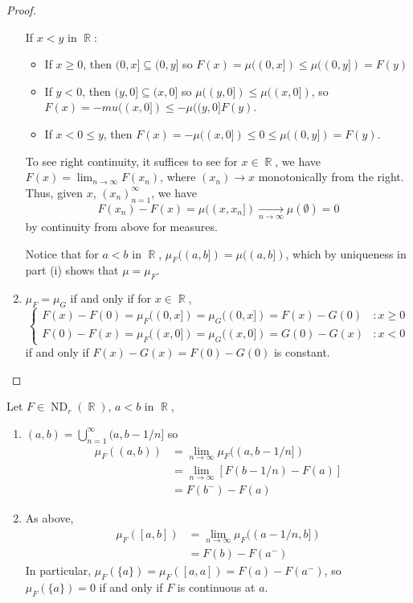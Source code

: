 \documentclass[11pt, a4paper]{memoir}
\DeclareMathOperator{\R}{{\mathbb{R}}}
\theoremstyle{change}
\theoremstyle{plain}
\theoremstyle{nonumberplain}
\newtheorem{proof}{Proof}
\DeclareMathOperator{\ND}{ND}
\begin{document}
\begin{proof}
\begin{enumerate}
            If $x<y$ in $\R$:
            \begin{itemize}[nolistsep]
                \item If $x\geq 0$, then $(0,x]\subseteq(0,y]$ so $F(x)=\mu((0,x])\leq\mu((0,y])=F(y)$
                \item If $y<0$, then $(y,0]\subseteq(x,0]$ so $\mu((y,0])\leq\mu((x,0])$, so $F(x)=-mu((x,0])\leq -\mu((y,0]F(y)$.
                \item If $x<0\leq y$, then $F(x)=-\mu((x,0])\leq 0\leq \mu((0,y])=F(y)$.
            \end{itemize}
            To see right continuity, it suffices to see for $x\in\R$, we have $F(x)=\lim_{n\to\infty} F(x_n)$, where $(x_n)\to x$ monotonically from the right.
            Thus, given $x$, $(x_n)_{n=1}^\infty$, we have
            \begin{equation*}
                F(x_n)-F(x)=\mu((x,x_n])\underset{n\to\infty}\longrightarrow\mu(\emptyset)=0 %
            \end{equation*}
            by continuity from above for measures.

            Notice that for $a<b$ in $\R$, $\mu_F((a,b])=\mu((a,b])$, which by uniqueness in part (i) shows that $\mu=\mu_F$.
        \item $\mu_F=\mu_G$ if and only if for $x\in\R$,
            \begin{equation*}
                \begin{cases}
                    F(x)-F(0)=\mu_F((0,x])=\mu_G((0,x])=F(x)-G(0)&: x\geq 0\\
                    F(0)-F(x)=\mu_F((x,0])=\mu_G((x,0])=G(0)-G(x)&: x<0
                \end{cases}
            \end{equation*}
            if and only if $F(x)-G(x)=F(0)-G(0)$ is constant.
    \end{enumerate}
\end{proof}
Let $F\in\ND_r(\R)$, $a<b$ in $\R$,
\begin{enumerate}[nolistsep]
    \item $(a,b)=\bigcup_{n=1}^\infty(a,b-1/n]$ so
        \begin{align*}
            \mu_F((a,b)) &= \lim_{n\to\infty}\mu_F((a,b-1/n])\\ %
                         &= \lim_{n\to\infty}[F(b-1/n)-F(a)]\\
                         &= F(b^-)-F(a)
        \end{align*}
    \item As above,
        \begin{align*}
            \mu_F([a,b]) &= \lim_{n\to\infty}\mu_F((a-1/n,b])\\ %
                         &= F(b)-F(a^-)
        \end{align*}
        In particular, $\mu_F(\{a\})=\mu_F([a,a])=F(a)-F(a^-)$, so $\mu_F(\{a\})=0$ if and only if $F$ is continuous at $a$.
\end{enumerate}
\end{document}
